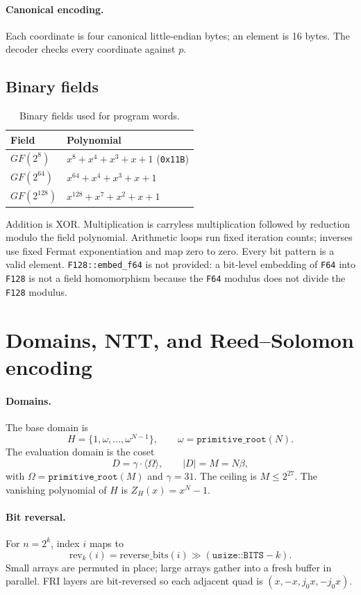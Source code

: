 \documentclass[11pt,a4paper]{article}
\begin{document}
\paragraph{Canonical encoding.} Each coordinate is four canonical
little-endian bytes; an element is 16 bytes. The decoder checks every
coordinate against $p$.

\subsection{Binary fields}

\begin{table}[h]
\centering
\small
\begin{tabular}{@{}ll@{}}
\toprule
Field & Polynomial \\
\midrule
$GF(2^8)$ & $x^8+x^4+x^3+x+1$ (\texttt{0x11B}) \\
$GF(2^{64})$ & $x^{64}+x^4+x^3+x+1$ \\
$GF(2^{128})$ & $x^{128}+x^7+x^2+x+1$ \\
\bottomrule
\end{tabular}
\caption{Binary fields used for program words.}
\end{table}

Addition is XOR. Multiplication is carryless multiplication followed by
reduction modulo the field polynomial. Arithmetic loops run fixed iteration
counts; inverses use fixed Fermat exponentiation and map zero to zero. Every
bit pattern is a valid element. \texttt{F128::embed\_f64} is not provided:
a bit-level embedding of \texttt{F64} into \texttt{F128} is not a field
homomorphism because the \texttt{F64} modulus does not divide the
\texttt{F128} modulus.

\section{Domains, NTT, and Reed--Solomon encoding}

\paragraph{Domains.} The base domain is
\[
H=\{1,\omega,\dots,\omega^{N-1}\},\qquad \omega=\texttt{primitive\_root}(N).
\]
The evaluation domain is the coset
\[
D=\gamma\cdot\langle\Omega\rangle,\qquad |D|=M=N\beta,
\]
with $\Omega=\texttt{primitive\_root}(M)$ and $\gamma=31$. The ceiling is
$M\le2^{27}$. The vanishing polynomial of $H$ is $Z_H(x)=x^N-1$.

\paragraph{Bit reversal.} For $n=2^k$, index $i$ maps to
\[
\mathrm{rev}_k(i)=\mathrm{reverse\_bits}(i)\gg(\texttt{usize::BITS}-k).
\]
Small arrays are permuted in place; large arrays gather into a fresh buffer in
parallel. FRI layers are bit-reversed so each adjacent quad is
$(x,-x,j_0x,-j_0x)$.
\end{document}
